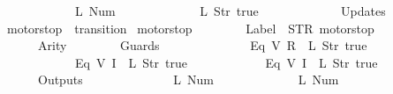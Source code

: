 \begin{isabellebody}
\ \ \ \ \ \ \ \ \ \ \ \ {\isacharparenleft}L\ {\isacharparenleft}Num\ {}{\isacharparenright}{\isacharparenright}{\isacharcomma}\isanewline
\ \ \ \ \ \ \ \ \ \ \ \ {\isacharparenleft}L\ {\isacharparenleft}Str\ {\isacharprime}{\isacharprime}true{\isacharprime}{\isacharprime}{\isacharparenright}{\isacharparenright}\isanewline
\ \ \ \ \ \ {\isacharbrackright}{\isacharcomma}\isanewline
\ \ \ \ \ \ Updates\ {\isacharequal}\ {\isacharbrackleft}{\isacharbrackright}\isanewline
{\isasymrparr}{\isachardoublequoteclose}\isanewline
\isanewline
{}\isamarkupfalse%
\ {\isachardoublequoteopen}motorstop{}{\isachardoublequoteclose}\ {\isacharcolon}{\isacharcolon}\ {\isachardoublequoteopen}transition{\isachardoublequoteclose}\ \isanewline
{\isachardoublequoteopen}motorstop{}\ {\isasymequiv}\ {\isasymlparr}\isanewline
\ \ \ \ \ \ Label\ {\isacharequal}\ STR\ {\isacharprime}{\isacharprime}motorstop{\isacharprime}{\isacharprime}{\isacharcomma}\isanewline
\ \ \ \ \ \ Arity\ {\isacharequal}\ {}{\isacharcomma}\isanewline
\ \ \ \ \ \ Guards\ {\isacharequal}\ {\isacharbrackleft}\isanewline
\ \ \ \ \ \ \ \ \ \ \ \ {\isacharparenleft}Eq\ {\isacharparenleft}V\ {\isacharparenleft}R\ {}{\isacharparenright}{\isacharparenright}\ {\isacharparenleft}L\ {\isacharparenleft}Str\ {\isacharprime}{\isacharprime}true{\isacharprime}{\isacharprime}{\isacharparenright}{\isacharparenright}{\isacharparenright}{\isacharcomma}\isanewline
\ \ \ \ \ \ \ \ \ \ \ \ {\isacharparenleft}Eq\ {\isacharparenleft}V\ {\isacharparenleft}I\ {}{\isacharparenright}{\isacharparenright}\ {\isacharparenleft}L\ {\isacharparenleft}Str\ {\isacharprime}{\isacharprime}true{\isacharprime}{\isacharprime}{\isacharparenright}{\isacharparenright}{\isacharparenright}{\isacharcomma}\isanewline
\ \ \ \ \ \ \ \ \ \ \ \ {\isacharparenleft}Eq\ {\isacharparenleft}V\ {\isacharparenleft}I\ {}{\isacharparenright}{\isacharparenright}\ {\isacharparenleft}L\ {\isacharparenleft}Str\ {\isacharprime}{\isacharprime}true{\isacharprime}{\isacharprime}{\isacharparenright}{\isacharparenright}{\isacharparenright}\isanewline
\ \ \ \ \ \ {\isacharbrackright}{\isacharcomma}\isanewline
\ \ \ \ \ \ Outputs\ {\isacharequal}\ {\isacharbrackleft}\isanewline
\ \ \ \ \ \ \ \ \ \ \ \ {\isacharparenleft}L\ {\isacharparenleft}Num\ {}{\isacharparenright}{\isacharparenright}{\isacharcomma}\isanewline
\ \ \ \ \ \ \ \ \ \ \ \ {\isacharparenleft}L\ {\isacharparenleft}Num\ {}{\isacharparenright}{\isacharparenright}{\isacharcomma}\isanewline

\end{isabellebody}

